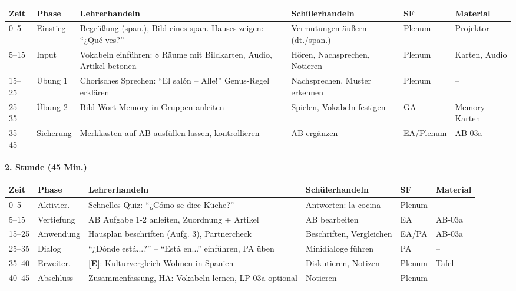 \documentclass[11pt,a4paper]{article}
\newcommand{\E}{\textcolor{erweiterung}{\textbf{[E]}}}
\begin{document}
\begin{longtable}{|p{1cm}|p{1.5cm}|p{4cm}|p{3cm}|p{1.5cm}|p{2cm}|}
\hline
\textbf{Zeit} & \textbf{Phase} & \textbf{Lehrerhandeln} & \textbf{Schülerhandeln} & \textbf{SF} & \textbf{Material} \\
\hline
\endhead

0--5 & Einstieg & Begrüßung (span.), Bild eines span. Hauses zeigen: ``¿Qué ves?'' & Vermutungen äußern (dt./span.) & Plenum & Projektor \\
\hline

5--15 & Input & Vokabeln einführen: 8 Räume mit Bildkarten, Audio, Artikel betonen & Hören, Nachsprechen, Notieren & Plenum & Karten, Audio \\
\hline

15--25 & Übung 1 & Chorisches Sprechen: ``El salón -- Alle!'' Genus-Regel erklären & Nachsprechen, Muster erkennen & Plenum & -- \\
\hline

25--35 & Übung 2 & Bild-Wort-Memory in Gruppen anleiten & Spielen, Vokabeln festigen & GA & Memory-Karten \\
\hline

35--45 & Sicherung & Merkkasten auf AB ausfüllen lassen, kontrollieren & AB ergänzen & EA/Plenum & AB-03a \\
\hline
\end{longtable}

\vspace{1em}

\textbf{2. Stunde (45 Min.)}

\begin{longtable}{|p{1cm}|p{1.5cm}|p{4cm}|p{3cm}|p{1.5cm}|p{2cm}|}
\hline
\textbf{Zeit} & \textbf{Phase} & \textbf{Lehrerhandeln} & \textbf{Schülerhandeln} & \textbf{SF} & \textbf{Material} \\
\hline
\endhead

0--5 & Aktivier. & Schnelles Quiz: ``¿Cómo se dice Küche?'' & Antworten: la cocina & Plenum & -- \\
\hline

5--15 & Vertiefung & AB Aufgabe 1-2 anleiten, Zuordnung + Artikel & AB bearbeiten & EA & AB-03a \\
\hline

15--25 & Anwendung & Hausplan beschriften (Aufg. 3), Partnercheck & Beschriften, Vergleichen & EA/PA & AB-03a \\
\hline

25--35 & Dialog & ``¿Dónde está...?'' -- ``Está en...'' einführen, PA üben & Minidialoge führen & PA & -- \\
\hline

35--40 & Erweiter. & \E{}: Kulturvergleich Wohnen in Spanien & Diskutieren, Notizen & Plenum & Tafel \\
\hline

40--45 & Abschluss & Zusammenfassung, HA: Vokabeln lernen, LP-03a optional & Notieren & Plenum & -- \\
\hline
\end{longtable}
\end{document}
